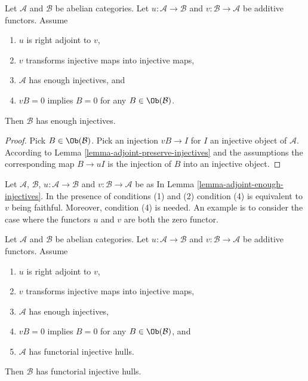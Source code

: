 \begin{lemma}
\label{lemma-adjoint-enough-injectives}
Let $\mathcal{A}$ and $\mathcal{B}$ be abelian categories.
Let $u : \mathcal{A} \to \mathcal{B}$ and
$v : \mathcal{B} \to \mathcal{A}$ be additive functors.
Assume
\begin{enumerate}
\item $u$ is right adjoint to $v$,
\item $v$ transforms injective maps into injective maps,
\item $\mathcal{A}$ has enough injectives, and
\item $vB = 0$ implies $B = 0$ for any $B \in \Ob(\mathcal{B})$.
\end{enumerate}
Then $\mathcal{B}$ has enough injectives.
\end{lemma}

\begin{proof}
Pick $B \in \Ob(\mathcal{B})$.
Pick an injection $vB \to I$ for $I$
an injective object of $\mathcal{A}$.
According to Lemma \ref{lemma-adjoint-preserve-injectives}
and the assumptions the corresponding map
$B \to uI$ is the injection of $B$ into an injective object.
\end{proof}

\begin{remark}
\label{remark-faithfulness-needed}
Let $\mathcal{A}$, $\mathcal{B}$, $u : \mathcal{A} \to \mathcal{B}$ and
$v : \mathcal{B} \to \mathcal{A}$ be as
In Lemma \ref{lemma-adjoint-enough-injectives}.
In the presence of conditions (1) and (2) condition (4) is equivalent
to $v$ being faithful. Moreover, condition (4) is needed.
An example is to consider the
case where the functors $u$ and $v$ are both the zero functor.
\end{remark}

\begin{lemma}
\label{lemma-adjoint-functorial-injectives}
Let $\mathcal{A}$ and $\mathcal{B}$ be abelian categories.
Let $u : \mathcal{A} \to \mathcal{B}$ and
$v : \mathcal{B} \to \mathcal{A}$ be additive functors.
Assume
\begin{enumerate}
\item $u$ is right adjoint to $v$,
\item $v$ transforms injective maps into injective maps,
\item $\mathcal{A}$ has enough injectives,
\item $vB = 0$ implies $B = 0$ for any $B \in \Ob(\mathcal{B})$, and
\item $\mathcal{A}$ has functorial injective hulls.
\end{enumerate}
Then $\mathcal{B}$ has functorial injective hulls.
\end{lemma}

